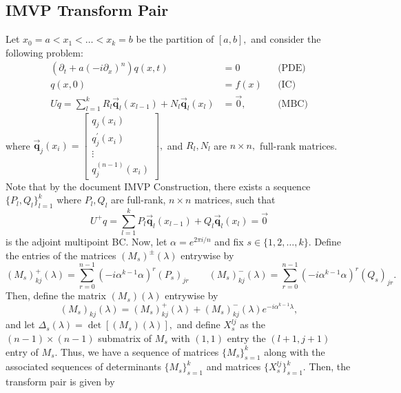 \documentclass[11pt,reqno,oneside,a4paper]{article}
\theoremstyle{plain} %
\theoremstyle{definition}
\theoremstyle{remark}
\begin{document}
	
\subsection*{IMVP Transform Pair}
Let $x_0 = a < x_1  < \ldots < x_k = b $ be the partition of $[a,b],$ and consider the following problem:
\begin{align*}
(\partial_t +  a (-i\partial_{x})^n)q(x,t)&= 0 &&\text{(PDE)} \\
q(x, 0) &= f(x) &&\text{(IC)} \\
Uq = \sum^k_{l=1} R_l \vec{\textbf{q}}_l(x_{l-1}) + N_l \vec{\textbf{q}}_l(x_{l}) &= \vec{0}, &&\text{(MBC)}
\end{align*}
where $\vec{\textbf{q}}_j(x_i) = \begin{bmatrix} q_j(x_i) \\ q_j^{\prime}(x_i) \\ \vdots \\ q_j^{(n-1)}(x_i) \end{bmatrix},$ and $R_l, N_l$ are $n \times n,$ full-rank matrices. Note that by the document IMVP Construction, there exists a sequence $\{ P_l, Q_l \}_{l=1}^k$ where $P_l, Q_l$ are full-rank, $n \times n$ matrices, such that 
\[ 
U^+q = \sum^k_{l=1} P_l \vec{\textbf{q}}_l(x_{l-1}) + Q_l \vec{\textbf{q}}_l(x_{l}) = \vec{0}
\]
is the adjoint multipoint BC. Now, let $\alpha = e^{2 \pi i/n}$ and fix $s \in \{ 1, 2, \ldots, k\}.$ Define the entries of the matrices $(M_s)^{\pm}(\lambda)$ entrywise by 
\[ 
(M_s)^{+}_{kj}(\lambda)= \sum^{n-1}_{r = 0} (- i \alpha^{k-1} \alpha)^r (P_s)_{jr} \qquad (M_s)^{-}_{kj}(\lambda)= \sum^{n-1}_{r = 0} (- i \alpha^{k-1} \alpha)^r (Q_s)_{jr}.
\]
Then, define the matrix $(M_s)(\lambda)$ entrywise by 
\[ (M_s)_{kj}(\lambda) = (M_s)^{+}_{kj}(\lambda) + (M_s)^{-}_{kj}(\lambda) e^{- i \alpha^{k-1} \lambda},\]
and let $\Delta_s(\lambda) = \det [(M_s)(\lambda)],$ and define $X_s^{lj}$ as the $(n-1)\times(n-1)$ submatrix of $M_s$ with $(1,1)$ entry the $(l+1, j+1)$ entry of $M_s.$ Thus, we have a sequence of matrices $\{M_s\}_{s=1}^k$ along with the associated sequences of determinants $\{M_s\}_{s=1}^k$ and matrices $\{X_s^{lj}\}_{s=1}^k.$ Then, the transform pair is given by 
\end{document}
